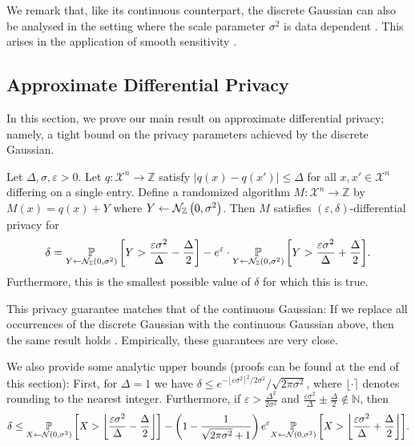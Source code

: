 \documentclass{jpc}
\newcommand{\dgausss}[2]{{\discN\left(#1,#2\right)}}
\newcommand{\dgauss}[1]{\dgausss{0}{#1}}
\newcommand{\pr}[2]{{\ifx&#1& \mathbb{P} \else
\underset{#1}{\mathbb{P}} \fi \left[#2\right]}}
\newcommand{\eps}{\varepsilon}
\newcommand{\Z}{\mathbb{Z}}
\begin{document}
We remark that, like its continuous counterpart, the discrete Gaussian can also be analysed in the setting where the scale parameter $\sigma^2$ is data dependent \citep{BunDRS18}. This arises in the application of smooth sensitivity \citep{NissimRS07,BunS19}.

\subsection{Approximate Differential Privacy}
In this section, we prove our main result on approximate differential privacy; namely, a tight bound on the privacy parameters achieved by the discrete Gaussian.
\begin{thm}\label{thm:approx-dp}
Let $\Delta,\sigma,\eps>0$. Let $q\colon \mathcal{X}^n \to \Z$ satisfy $|q(x)-q(x')|\le\Delta$ for all $x,x'\in\mathcal{X}^n$ differing on a single entry. Define a randomized algorithm $M\colon \mathcal{X}^n \to \Z$ by $M(x)=q(x)+Y$ where $Y \gets \dgauss{\sigma^2}$. Then $M$ satisfies $(\eps,\delta)$-differential privacy for 
\begin{equation}
\delta = \pr{Y \gets \dgauss{\sigma^2}}{Y > \frac{\eps \sigma^2}{\Delta} - \frac{\Delta}{2}} - e^\eps \cdot \pr{Y \gets \dgauss{\sigma^2}}{Y > \frac{\eps \sigma^2}{\Delta} + \frac{\Delta}{2}}.
\end{equation}
Furthermore, this is the smallest possible value of $\delta$ for which this is true.
\end{thm}
\noindent This privacy guarantee matches that of the continuous Gaussian: If we replace all occurrences of the discrete Gaussian with the continuous Gaussian above, then the same result holds \cite[Thm.~8]{BalleW18}. Empirically, these guarantees are very close.


We also provide some analytic upper bounds (proofs can be found at the end of this section): First, for $\Delta=1$ we have $\delta \le e^{-\lfloor \eps \sigma^2 \rceil^2/2\sigma^2}/\sqrt{2\pi\sigma^2}$, where $\lfloor \cdot \rceil$ denotes rounding to the nearest integer. Furthermore, if $\eps > \frac{\Delta^2}{2\sigma^2}$ and $\frac{\eps\sigma^2}{\Delta}\pm \frac{\Delta}{2}\notin \mathbb{N}$, then \begin{equation}
\delta \le \pr{X \gets \mathcal{N}(0,\sigma^2)}{ X > \left\lfloor \frac{\eps\sigma^2}{\Delta}-\frac{\Delta}{2} \right\rfloor }-\left(1-\frac{1}{\sqrt{2\pi\sigma^2}+1}\right)e^\eps\pr{X \gets \mathcal{N}(0,\sigma^2)}{X > \left\lfloor \frac{\eps\sigma^2}{\Delta}+\frac{\Delta}{2} \right\rfloor }.\label{eq:analytic_ed}
\end{equation}
\end{document}
